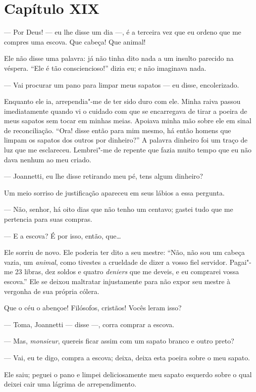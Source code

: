 \section*{Capítulo XIX}

 --- Por Deus! --- eu lhe disse um dia ---, é a terceira vez que eu
ordeno que me compres uma escova. Que cabeça! Que animal!

 Ele não disse uma palavra: já não tinha dito nada a um insulto parecido
na véspera. ``Ele é tão consciencioso!'' dizia eu; e não imaginava nada.

 --- Vai procurar um pano para limpar meus sapatos --- eu disse,
encolerizado.

Enquanto ele ia, arrependia"-me de ter sido duro com ele. Minha raiva
passou imediatamente quando vi o cuidado com que se encarregava de
tirar a poeira de meus sapatos sem tocar em minhas meias. Apoiava minha
mão sobre ele em sinal de reconciliação. ``Ora! disse então para mim
mesmo, há então homens que limpam os sapatos dos outros por dinheiro?''
A palavra dinheiro foi um traço de luz que me esclareceu. Lembrei"-me de
repente que fazia muito tempo que eu não dava nenhum ao meu criado.

--- Joannetti, eu lhe disse retirando meu pé, tens algum dinheiro?

Um meio sorriso de justificação apareceu em seus lábios a essa pergunta.


--- Não, senhor, há oito dias que não tenho um centavo; gastei tudo que
me pertencia para suas compras.

--- E a escova? É por isso, então, que\ldots

Ele sorriu de novo. Ele poderia ter dito a seu mestre: ``Não, não sou um
cabeça vazia, um \textit{animal}, como tivestes a crueldade de dizer a
vosso fiel servidor. Pagai"-me 23 libras, dez soldos e quatro \textit{deniers}
que me deveis, e eu comprarei vossa escova.'' Ele se deixou maltratar
injustamente para não expor seu mestre à vergonha de sua própria
cólera.

Que o céu o abençoe! Filósofos, cristãos! Vocês leram isso?

--- Toma, Joannetti --- disse ---, corra comprar a escova.

--- Mas, \textit{monsieur}, quereis ficar assim com um sapato branco e
outro preto?

--- Vai, eu te digo, compra a escova; deixa, deixa esta poeira sobre o
meu sapato.

Ele saiu; peguei o pano e limpei deliciosamente meu sapato esquerdo
sobre o qual deixei cair uma lágrima de arrependimento.

